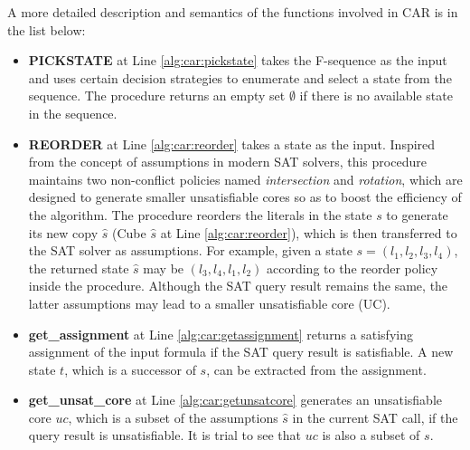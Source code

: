 A more detailed description and semantics of the functions involved in CAR is in the list below:
\fi

\begin{itemize}
    \item \textbf{PICKSTATE} at Line \ref{alg:car:pickstate} takes the F-sequence as the input and uses certain decision strategies to enumerate and select a state from the sequence. The procedure returns an empty set $\emptyset$ if there is no available state in the sequence.
    \item \textbf{REORDER} at Line \ref{alg:car:reorder} takes a state as the input. Inspired from the concept of assumptions in modern SAT solvers, this procedure maintains two non-conflict policies named \emph{intersection} and \emph{rotation}, which are designed to generate smaller unsatisfiable cores so as to boost the efficiency of the algorithm. The procedure reorders the literals in the state $s$ to generate its new copy $\hat{s}$ (Cube $\hat{s}$ at Line \ref{alg:car:reorder}), which is then transferred to the SAT solver as assumptions. For example, given a state $s=(l_{1}, l_{2}, l_{3}, l_{4})$, the returned state $\hat{s}$ may be $(l_{3}, l_{4}, l_{1}, l_{2})$ according to the reorder policy inside the procedure. Although the SAT query result remains the same, the latter assumptions may lead to a  smaller unsatisfiable core (UC). 
    \item \textbf{get\_assignment} at Line \ref{alg:car:getassignment} returns a satisfying assignment of the input formula if the SAT query result is satisfiable. A new state $t$, which is a successor of $s$, can be extracted from the assignment.
    \item \textbf{get\_unsat\_core} at Line \ref{alg:car:getunsatcore} generates an unsatisfiable core $uc$, which is a subset of the assumptions $\hat{s}$ in the current SAT call, if the query result is unsatisfiable. It is trial to see that $uc$ is also a subset of $s$.

\end{itemize}
